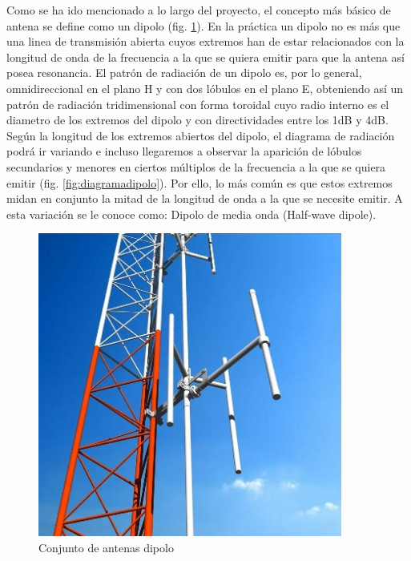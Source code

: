 \par Como se ha ido mencionado a lo largo del proyecto, el concepto más básico de antena se define como un dipolo (fig. \ref{fig:conjuntodipolo}). En la práctica un dipolo no es más que una linea de transmisión abierta cuyos extremos han de estar relacionados con la longitud de onda de la frecuencia a la que se quiera emitir para que la antena así posea resonancia. El patrón de radiación de un dipolo es, por lo general, omnidireccional en el plano H y con dos lóbulos en el plano E, obteniendo así un patrón de radiación tridimensional con forma toroidal cuyo radio interno es el diametro de los extremos del dipolo y con directividades entre los 1dB y 4dB. Según la longitud de los extremos abiertos del dipolo, el diagrama de radiación podrá ir variando e incluso llegaremos a observar la aparición de lóbulos secundarios y menores en ciertos múltiplos de la frecuencia a la que se quiera emitir (fig. \ref{fig:diagramadipolo}). Por ello, lo más común es que estos extremos midan en conjunto la mitad de la longitud de onda a la que se necesite emitir. A esta variación se le conoce como: Dipolo de media onda (Half-wave dipole).
\\
\begin{figure}[h]
    \centering
        \includegraphics[width=10cm]{archivos/dipolo/dipoloo}
        \caption{Conjunto de antenas dipolo \citep{Ideal-Antenas2008}}
        \label{fig:conjuntodipolo}
\end{figure}


